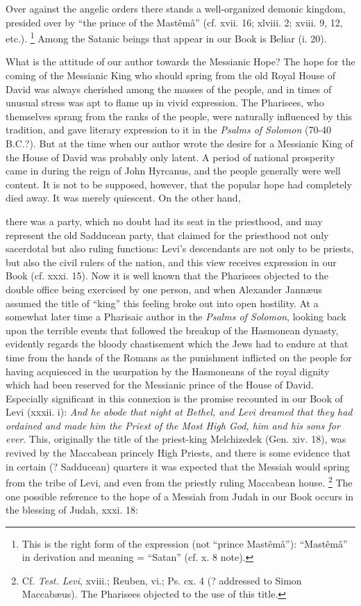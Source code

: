 Over against the angelic orders there stands a well-organized demonic kingdom, presided over by ``the prince of the Mastêmâ'' (cf. xvii. 16; xlviii. 2; xviii. 9, 12, etc.). \footnote{This is the right form of the expression (not ``prince Mastêmâ''): ``Mastêmâ'' in derivation and meaning = ``Satan'' (cf. x. 8 note).} Among the Satanic beings that appear in our Book is Beliar (i. 20).

What is the attitude of our author towards the Messianic Hope? The hope for the coming of the Messianic King who should spring from the old Royal House of David was always cherished among the masses of the people, and in times of unusual stress was apt to flame up in vivid expression. The Pharisees, who themselves sprang from the ranks of the people, were naturally influenced by this tradition, and gave literary expression to it in the \emph{Psalms of Solomon} (70-40 B.C.?). But at the time when our author wrote the desire for a Messianic King of the House of David was probably only latent. A period of national prosperity came in during the reign of John Hyrcanus, and the people generally were well content. It is not to be supposed, however, that the popular hope had completely died away. It was merely quiescent. On the other hand,

there was a party, which no doubt had its seat in the priesthood, and may represent the old Sadducean party, that claimed for the priesthood not only sacerdotal but also ruling functions: Levi's descendants are not only to be priests, but also the civil rulers of the nation, and this view receives expression in our Book (cf. xxxi. 15). Now it is well known that the Pharisees objected to the double office being exercised by one person, and when Alexander Jannæus assumed the title of ``king'' this feeling broke out into open hostility. At a somewhat later time a Pharisaic author in the \emph{Psalms of Solomon}, looking back upon the terrible events that followed the breakup of the Hasmonean dynasty, evidently regards the bloody chastisement which the Jews had to endure at that time from the hands of the Romans as the punishment inflicted on the people for having acquiesced in the usurpation by the Hasmoneans of the royal dignity which had been reserved for the Messianic prince of the House of David. Especially significant in this connexion is the promise recounted in our Book of Levi (xxxii. i): \emph{And he abode that night at Bethel, and Levi dreamed that they had ordained and made him the Priest of the Most High God, him and his sons for ever}. This, originally the title of the priest-king Melchizedek (Gen. xiv. 18), was revived by the Maccabean princely High Priests, and there is some evidence that in certain (? Sadducean) quarters it was expected that the Messiah would spring from the tribe of Levi, and even from the priestly ruling Maccabean house. \footnote{Cf. \emph{Test. Levi}, xviii.; Reuben, vi.; Ps. cx. 4 (? addressed to Simon Maccabæus). The Pharisees objected to the use of this title.} The one possible reference to the hope of a Messiah from Judah in our Book occurs in the blessing of Judah, xxxi. 18:

